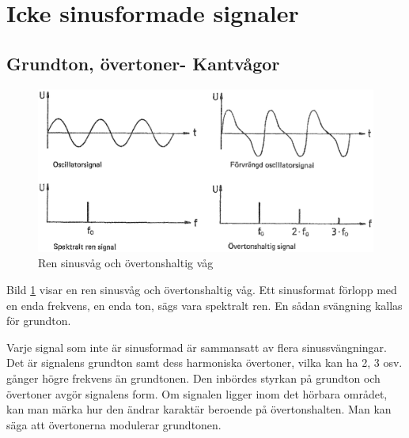 
\section{Icke sinusformade signaler}


\subsection{Grundton, övertoner- Kantvågor}


\begin{figure}
	\includegraphics[width=.9\textwidth]{images/cropped_pdfs/bild_2_1-18.pdf}
	\caption{Ren sinusvåg och övertonshaltig våg}
	\label{fig:BildII1-18}
\end{figure}

Bild \ref{fig:BildII1-18} visar en ren sinusvåg och övertonshaltig
våg. Ett sinusformat förlopp med en enda frekvens, en enda ton, sägs
vara spektralt ren.
En sådan svängning kallas för grundton.

Varje signal som inte är sinusformad är sammansatt av flera sinussvängningar.
Det är signalens grundton samt dess harmoniska övertoner, vilka kan ha 2, 3
osv. gånger högre frekvens än grundtonen.
Den inbördes styrkan på grundton och övertoner avgör signalens form.
Om signalen ligger inom det hörbara området, kan man märka hur den ändrar
karaktär beroende på övertonshalten.
Man kan säga att övertonerna modulerar grundtonen.

